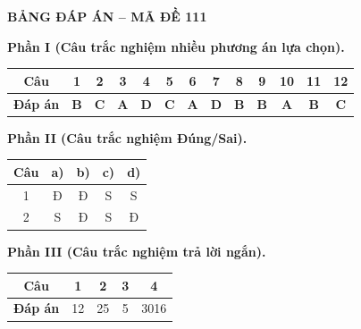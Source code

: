 \vspace{0.4cm}
\noindent\begin{minipage}{\linewidth}
\begin{center}{\large\bfseries\color{red!80!black} BẢNG ĐÁP ÁN -- MÃ ĐỀ 111}\end{center}
\vspace{0.15cm}
\noindent\textbf{Phần I (Câu trắc nghiệm nhiều phương án lựa chọn).}\par\smallskip
\begin{center}
\begin{tabular}{|c|c|c|c|c|c|c|c|c|c|c|c|c|}\hline
\textbf{Câu} & 1 & 2 & 3 & 4 & 5 & 6 & 7 & 8 & 9 & 10 & 11 & 12 \\ \hline
\textbf{Đáp án} & \textbf{B} & \textbf{C} & \textbf{A} & \textbf{D} & \textbf{C} & \textbf{A} & \textbf{D} & \textbf{B} & \textbf{B} & \textbf{A} & \textbf{B} & \textbf{C} \\ \hline
\end{tabular}
\end{center}
\noindent\textbf{Phần II (Câu trắc nghiệm Đúng/Sai).}\par\smallskip
\begin{center}
\begin{tabular}{|c|c|c|c|c|}\hline
\textbf{Câu} & \textbf{a)} & \textbf{b)} & \textbf{c)} & \textbf{d)} \\ \hline
1 & Đ & Đ & S & S \\ \hline
2 & S & Đ & S & Đ \\ \hline
\end{tabular}
\end{center}
\noindent\textbf{Phần III (Câu trắc nghiệm trả lời ngắn).}\par\smallskip
\begin{center}
\begin{tabular}{|c|c|c|c|c|}\hline
\textbf{Câu} & 1 & 2 & 3 & 4 \\ \hline
\textbf{Đáp án} & 12 & 25 & 5 & 3016 \\ \hline
\end{tabular}
\end{center}
\end{minipage}
